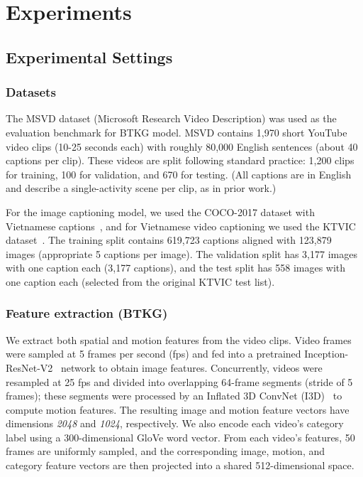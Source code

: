 \section{Experiments}

\subsection{Experimental Settings}

\subsubsection{Datasets}

The MSVD dataset (Microsoft Research Video Description) was used as the evaluation benchmark for BTKG model. MSVD contains 1,970 short YouTube video clips (10-25 seconds each) with roughly 80,000 English sentences (about 40 captions per clip). These videos are split following standard practice: 1,200 clips for training, 100 for validation, and 670 for testing. (All captions are in English and describe a single-activity scene per clip, as in prior work.)

For the image captioning model, we used the COCO-2017 dataset with Vietnamese captions~\cite{vietnamese_coco_2017}, and for Vietnamese video captioning we used the KTVIC dataset~\cite{pham2024ktvic}. The training split contains 619{,}723 captions aligned with 123{,}879 images (appropriate 5 captions per image). The validation split has 3{,}177 images with one caption each (3{,}177 captions), and the test split has 558 images with one caption each (selected from the original KTVIC test list).

\subsubsection{Feature extraction (BTKG)}

We extract both spatial and motion features from the video clips. Video frames were sampled at 5 frames per second (fps) and fed into a pretrained Inception-ResNet-V2~\cite{szegedy2016inceptionv4} network to obtain image features. Concurrently, videos were resampled at 25 fps and divided into overlapping 64-frame segments (stride of 5 frames); these segments were processed by an Inflated 3D ConvNet (I3D)~\cite{Carreira_2017_CVPR} to compute motion features. The resulting image and motion feature vectors have dimensions \textit{2048} and \textit{1024}, respectively. We also encode each video's category label using a 300-dimensional GloVe word vector. From each video's features, 50 frames are uniformly sampled, and the corresponding image, motion, and category feature vectors are then projected into a shared 512-dimensional space.

